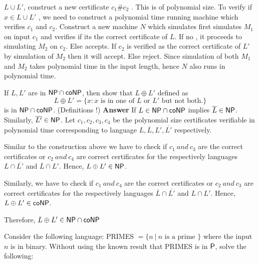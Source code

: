 \documentclass[addpoints,12pt]{exam}
\begin{document}
\begin{questions}
$L \cup L'$, construct a new certificate $c_{1}\#c_{2}$ . This is of polynomial size. To verify if $x \in L \cup L'$ , we need to construct a polynomial time running machine
which verifies $c_{1}$ and $c_{2}$. Construct a new machine $N$ which simulates first simulates $M_{1}$ on input $c_{1}$ and verifies if its the correct certificate of $L$.
If no , it proceeds to simulating $M_{2}$ on $c_{2}$. Else accepts. If $c_{2}$ is verified as the correct certificate of $L'$ by simulation of $M_{2}$ then it will accept. Else reject.
Since simulation of both $M_{1}$ and $M_{2}$ takes polynomial time in the input length, hence $N$ also runs in polynomial time.

\question[5]
If $L, L'$ are in $\NP \cap \co\NP$, then show that $L \oplus  L'$ defined as 
\[ L \oplus L' = \{ x : x \textrm{ is in one of $L$ or $L'$ but not both.} \} \]
is in $\NP \cap \co\NP$. (Definitions !)\newline
\textbf{Answer} \newline
If $L \in \NP \cap \co\NP$ implies $\overline{L} \in \NP$. Similarly, $\overline{L'} \in \NP$.\newline
Let $c_{1},c_{2},c_{3},c_{4}$ be the polynomial size certificates verifiable in polynomial time corresponding to language $L,\overline{L},L',\overline{L'}$ respectively. \newline

Similar to the construction above we have to check if $c_{1}~and~c_{3}$ are the correct certificates or $c_{2}~and~c_{4}$ are correct certificates for the respectively
languages $L \cap \overline{L'}$ and $\overline{L} \cap L'$. Hence, $L \oplus  L' \in \NP$. \newline

Similarly, we have to check if $c_{1}~and~c_{4}$ are the correct certificates or $c_{2}~and~c_{3}$ are correct certificates for the respectively
languages $\overline{L} \cap \overline{L'}$ and $L \cap L'$. Hence, $L \oplus  L' \in \co\NP$.\newline

Therefore, $L \oplus  L' \in \NP \cap \co\NP$





\question[15]
Consider the following language: PRIMES $= \{ n ~|~ n
\textrm{ is a prime } \}$ where the input $n$ is in binary.  Without
using the known result that PRIMES is in $\P$, solve the following:
\end{questions}
\end{document}
